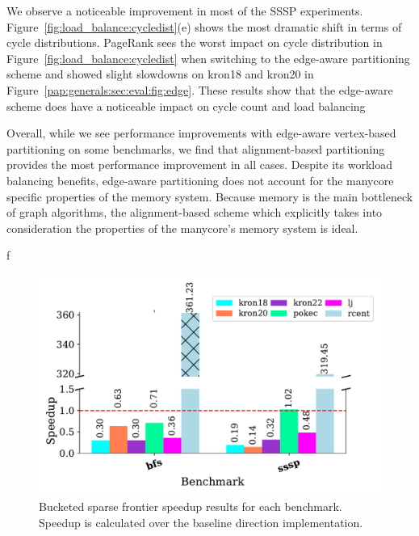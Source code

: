 We observe a noticeable improvement in most of the SSSP experiments.
Figure~\ref{fig:load_balance:cycledist}(e) shows the most dramatic shift in terms of cycle distributions. %
PageRank sees the worst impact on cycle distribution in Figure~\ref{fig:load_balance:cycledist} when switching to the edge-aware partitioning scheme and showed slight slowdowns on kron18 and kron20 in Figure~\ref{pap:generals:sec:eval:fig:edge}.
These results show that the edge-aware scheme does have a noticeable impact on cycle count and load balancing
 
Overall, while we see performance improvements with edge-aware vertex-based partitioning on some benchmarks, we find that alignment-based partitioning provides the most performance improvement in all cases. 
Despite its workload balancing benefits, edge-aware partitioning does not account for the manycore specific properties of the memory system.
Because memory is the main bottleneck of graph algorithms, the alignment-based scheme which explicitly takes into consideration the properties of the manycore's memory system is ideal. 

f
\begin{figure}[!ht]
    \centering
    \includegraphics[scale=0.65]{graphit-figures/sparse.pdf}
    \caption{Bucketed sparse frontier speedup results for each benchmark. Speedup is calculated over the baseline \push direction implementation.} %
    \label{pap:cgo2020:sec:eval:fig:sparse}
\end{figure}

